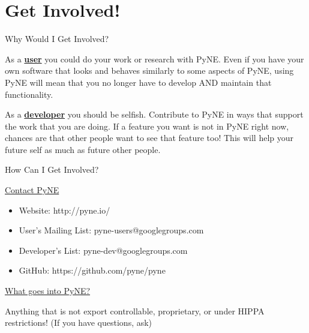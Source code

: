 \documentclass[xcolor=x11names,compress]{beamer}
\renewcommand{\(}{\begin{columns}}
\renewcommand{\)}{\end{columns}}
\newcommand{\<}[1]{\begin{column}{#1}}
\renewcommand{\>}{\end{column}}
\begin{document}
\section{Get Involved!}
\begin{frame}{Why Would I Get Involved?}

As a \underline{\textcolor{byellow}{\textbf{user}}} you could do your work or research with PyNE.  Even if you have your own software that looks and behaves similarly to some aspects of PyNE, using PyNE will mean that you no longer have to develop AND maintain that functionality.

\vspace*{2 em}
As a \underline{\textcolor{byellow}{\textbf{developer}}} you should be selfish.  Contribute to PyNE in ways that support the work that you are doing. If a feature you want is not in PyNE right now, chances are that other people want to see that feature too! This will help your future self as much as future other people.

\end{frame}

\begin{frame}{How Can I Get Involved?}

    \underline{\textcolor{byellow}{Contact PyNE}}
    \begin{itemize}
    \item Website: http://pyne.io/
    \item User's Mailing List: pyne-users@googlegroups.com
    \item Developer's List: pyne-dev@googlegroups.com
    \item GitHub: https://github.com/pyne/pyne
    \end{itemize}
    
    \vspace*{2 em}
    \underline{\textcolor{byellow}{What goes into PyNE?}}

    Anything that is not export controllable, proprietary, 
    or under HIPPA restrictions!  (If you have questions, ask)
  
\end{frame}

\end{document}
